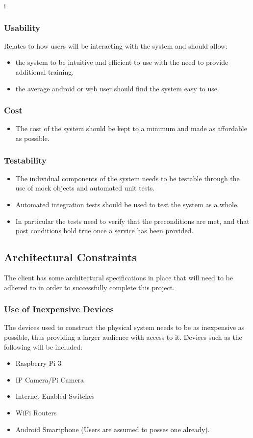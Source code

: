 i\documentclass[a4paper,12pt]{article}
\begin{document}
	\subsubsection{Usability}
	Relates to how users will be interacting with the system and should allow:
	\begin{itemize}
		\item the system to be intuitive and efficient to use with the need to provide additional training.
		\item the average android or web user should find the system easy to use.
	\end{itemize}
	
	\subsubsection{Cost}
	\begin{itemize}
		\item The cost of the system should be kept to a minimum and made as affordable as possible.  
	\end{itemize}
	
	\subsubsection{Testability}
	\begin{itemize}
		\item The individual components of the system needs to be testable through the use of mock objects and automated unit tests.
		\item Automated integration tests should be used to test the system as a whole.
		\item In particular the tests need to verify that the preconditions are met, and that post conditions hold true once a service has been provided.
	\end{itemize}
	
	\newpage
	\subsection{Architectural Constraints}
	The client has some architectural specifications in place that will need to be adhered to in order to successfully complete this project.
	
	\subsubsection{Use of Inexpensive Devices}
	The devices used to construct the physical system needs to be as inexpensive as possible, thus providing a larger audience with access to it. Devices such as the following will be included:
	\begin{itemize}
		\item Raspberry Pi 3
		\item IP Camera/Pi Camera
		\item Internet Enabled Switches
		\item WiFi Routers
		\item Android Smartphone (Users are assumed to posses one already).
	\end{itemize}
	
\end{document}
